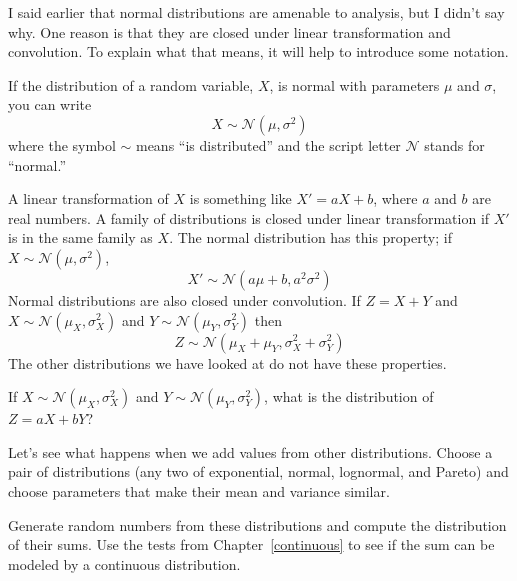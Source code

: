 \documentclass[12pt]{book}
\begin{document}
\newcommand{\normal}{\mathcal{N}}
\newcommand{\hasdist}{\sim}

I said earlier that normal distributions are amenable to analysis,
but I didn't say why.  One reason is that they are
closed under linear transformation and convolution.  To explain what
that means, it will help to introduce some notation.


If the distribution of a random variable, $X$, is
normal with parameters $\mu$ and $\sigma$, you can write
%
\[ X \hasdist \normal (\mu, \sigma^2) \]
%
where the symbol $\hasdist$ means ``is distributed'' and the script letter
$\normal$ stands for ``normal.''



A linear transformation of $X$ is something like $X' = aX + b$, where $a$
and $b$ are real numbers.  A family of distributions is closed under
linear transformation if $X'$ is in the same family as $X$.  The normal
distribution has this property; if $X \hasdist \normal (\mu,
\sigma^2)$,
%
\[ X' \hasdist \normal (a \mu + b, a^2 \sigma^2) \]
%
Normal distributions are also closed under convolution.  
If $Z = X+Y$ and
$X \hasdist \normal (\mu_X, \sigma_X^2)$ and
$Y \hasdist \normal (\mu_Y, \sigma_Y^2)$ then
%
\[ Z \hasdist \normal (\mu_X + \mu_Y, \sigma_X^2 + \sigma_Y^2) \]
%
The other distributions we have looked at do not have these
properties.


\begin{exercise}
If 
$X \hasdist \normal (\mu_X, \sigma_X^2)$ and
$Y \hasdist \normal (\mu_Y, \sigma_Y^2)$, what is the distribution
of $Z = aX + bY$?

\end{exercise}

\begin{exercise}
Let's see what happens when we add values from
other distributions.  Choose a pair of distributions (any two of
exponential, normal, lognormal, and Pareto) and choose parameters
that make their mean and variance similar.



Generate random numbers from these distributions and compute the
distribution of their sums.  Use the tests from
Chapter~\ref{continuous} to see if the sum can be modeled by a
continuous distribution.

\end{exercise}
\end{document}
